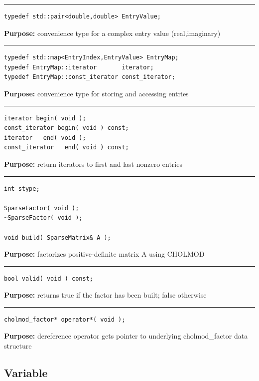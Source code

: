 \documentclass{article}
\begin{document}
\hspace{-.21in}\rule{5in}{1pt}
\begin{verbatim}
typedef std::pair<double,double> EntryValue;
\end{verbatim}
\textbf{Purpose:}
convenience type for a complex entry value (real,imaginary)

\hspace{-.21in}\rule{5in}{1pt}
\begin{verbatim}
typedef std::map<EntryIndex,EntryValue> EntryMap;
typedef EntryMap::iterator       iterator;
typedef EntryMap::const_iterator const_iterator;
\end{verbatim}
\textbf{Purpose:}
convenience type for storing and accessing entries

\hspace{-.21in}\rule{5in}{1pt}
\begin{verbatim}
iterator begin( void );
const_iterator begin( void ) const;
iterator   end( void );
const_iterator   end( void ) const;
\end{verbatim}
\textbf{Purpose:}
return iterators to first and last nonzero entries

\hspace{-.21in}\rule{5in}{1pt}
\begin{verbatim}
int stype;

SparseFactor( void );
~SparseFactor( void );

void build( SparseMatrix& A );
\end{verbatim}
\textbf{Purpose:}
factorizes positive-definite matrix A using CHOLMOD

\hspace{-.21in}\rule{5in}{1pt}
\begin{verbatim}
bool valid( void ) const;
\end{verbatim}
\textbf{Purpose:}
returns true if the factor has been built; false otherwise

\hspace{-.21in}\rule{5in}{1pt}
\begin{verbatim}
cholmod_factor* operator*( void );
\end{verbatim}
\textbf{Purpose:}
dereference operator gets pointer to underlying cholmod\_factor data structure

\pagebreak\subsection{Variable}

 
\end{document}

